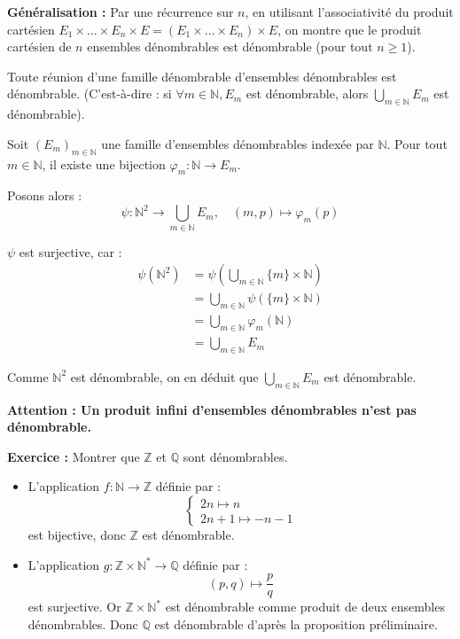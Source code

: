 \documentclass[a4paper,11pt]{article}
\newcommand{\N}{\mathbb{N}}
\begin{document}
\textbf{Généralisation :} Par une récurrence sur $n$, en utilisant l'associativité du produit cartésien $E_1 \times \dots \times E_n \times E = (E_1 \times \dots \times E_n) \times E$, on montre que le produit cartésien de $n$ ensembles dénombrables est dénombrable (pour tout $n \ge 1$).

\begin{corollaire}
Toute réunion d'une famille dénombrable d'ensembles dénombrables est dénombrable. (C'est-à-dire : si $\forall m \in \N, E_m$ est dénombrable, alors $\bigcup_{m \in \N} E_m$ est dénombrable).
\end{corollaire}

\begin{demonstration}
Soit $(E_m)_{m \in \N}$ une famille d'ensembles dénombrables indexée par $\N$. Pour tout $m \in \N$, il existe une bijection $\varphi_m : \N \to E_m$. 

Posons alors :
$$ \psi : \N^2 \to \bigcup_{m \in \N} E_m, \quad (m,p) \mapsto \varphi_m(p) $$

$\psi$ est surjective, car :
\begin{align*}
    \psi(\N^2) &= \psi\left(\bigcup_{m \in \N} \{m\} \times \N\right) \\
    &= \bigcup_{m \in \N} \psi(\{m\} \times \N) \\
    &= \bigcup_{m \in \N} \varphi_m(\N) \\
    &= \bigcup_{m \in \N} E_m
\end{align*}

Comme $\N^2$ est dénombrable, on en déduit que $\bigcup_{m \in \N} E_m$ est dénombrable.
\end{demonstration}

\begin{remarque}
\textbf{Attention : Un produit infini d'ensembles dénombrables n'est pas dénombrable.}
\end{remarque}

\textbf{Exercice :} Montrer que $\mathbb{Z}$ et $\mathbb{Q}$ sont dénombrables.

\begin{itemize}
    \item L'application $f : \N \to \mathbb{Z}$ définie par :
    $$ \begin{cases} 2n \mapsto n \\ 2n+1 \mapsto -n-1 \end{cases} $$
    est bijective, donc $\mathbb{Z}$ est dénombrable.
    
    \item L'application $g : \mathbb{Z} \times \N^* \to \mathbb{Q}$ définie par :
    $$ (p,q) \mapsto \frac{p}{q} $$
    est surjective. Or $\mathbb{Z} \times \N^*$ est dénombrable comme produit de deux ensembles dénombrables. Donc $\mathbb{Q}$ est dénombrable d'après la proposition préliminaire.
\end{itemize}
\end{document}
